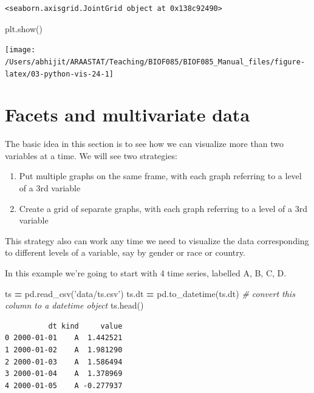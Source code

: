 \documentclass[
  letterpaper,
]{scrbook}
\newenvironment{Shaded}{\begin{snugshade}}{\end{snugshade}}
\newcommand{\CommentTok}[1]{\textcolor[rgb]{0.56,0.35,0.01}{\textit{#1}}}
\newcommand{\NormalTok}[1]{#1}
\newcommand{\OperatorTok}[1]{\textcolor[rgb]{0.81,0.36,0.00}{\textbf{#1}}}
\newcommand{\StringTok}[1]{\textcolor[rgb]{0.31,0.60,0.02}{#1}}
\providecommand{\tightlist}{%
  \setlength{\itemsep}{0pt}\setlength{\parskip}{0pt}}
\begin{document}
\begin{verbatim}
<seaborn.axisgrid.JointGrid object at 0x138c92490>
\end{verbatim}

\begin{Shaded}
\begin{Highlighting}[]
\NormalTok{plt.show()}
\end{Highlighting}
\end{Shaded}

\begin{center}\texttt{[image: /Users/abhijit/ARAASTAT/Teaching/BIOF085/BIOF085\_Manual\_files/figure-latex/03-python-vis-24-1]} \end{center}

\hypertarget{facets-and-multivariate-data}{%
\section{Facets and multivariate data}\label{facets-and-multivariate-data}}

The basic idea in this section is to see how we can visualize more than two variables at a time. We will see two strategies:

\begin{enumerate}
\def\labelenumi{\arabic{enumi}.}
\tightlist
\item
  Put multiple graphs on the same frame, with each graph referring to a level of a 3rd variable
\item
  Create a grid of separate graphs, with each graph referring to a level of a 3rd variable
\end{enumerate}

This strategy also can work any time we need to visualize the data corresponding to different levels of a variable, say by gender or race or country.

In this example we're going to start with 4 time series, labelled A, B, C, D.

\begin{Shaded}
\begin{Highlighting}[]
\NormalTok{ts }\OperatorTok{=}\NormalTok{ pd.read_csv(}\StringTok{'data/ts.csv'}\NormalTok{)}
\NormalTok{ts.dt }\OperatorTok{=}\NormalTok{ pd.to_datetime(ts.dt) }\CommentTok{# convert this column to a datetime object}
\NormalTok{ts.head()}
\end{Highlighting}
\end{Shaded}

\begin{verbatim}
          dt kind     value
0 2000-01-01    A  1.442521
1 2000-01-02    A  1.981290
2 2000-01-03    A  1.586494
3 2000-01-04    A  1.378969
4 2000-01-05    A -0.277937
\end{verbatim}
\end{document}
